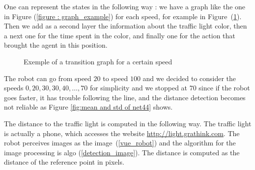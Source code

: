 \documentclass[14pt,a4paper]{article}
\theoremstyle{definition}
\begin{document}
One can represent the states in the following way : we have a graph like the one in Figure  (\ref{figure : graph_example}) for each speed, for example in Figure~(\ref{figure : graph_ex}). Then we add as a second layer the information about the traffic light color, then a next one for the time spent in the color, and finally one for the action that brought the agent in this position.
\begin{figure}[H]
\begin{center}
\end{center}
    \caption{Exemple of a transition graph for a certain speed}
    \label{figure : graph_ex}

\end{figure}


The robot can go from speed $20$ to speed $100$  and we decided to consider the speeds $0,20,30,30,40,\ldots, 70$ for simplicity and we stopped at $70$ since if the robot goes faster, it has trouble following the line, and the distance detection becomes not reliable as Figure \ref{fig:mean and std of net44} shows.


The distance to the traffic light is computed in the following way. The traffic light is actually a phone, which accesses the website \url{http://light.grathink.com}. The robot perceives images as the image~(\ref{vue_robot}) and the algorithm for the image processing is algo (\ref{detection_image}). The distance is computed as the distance of the reference point in pixels.
\end{document}
